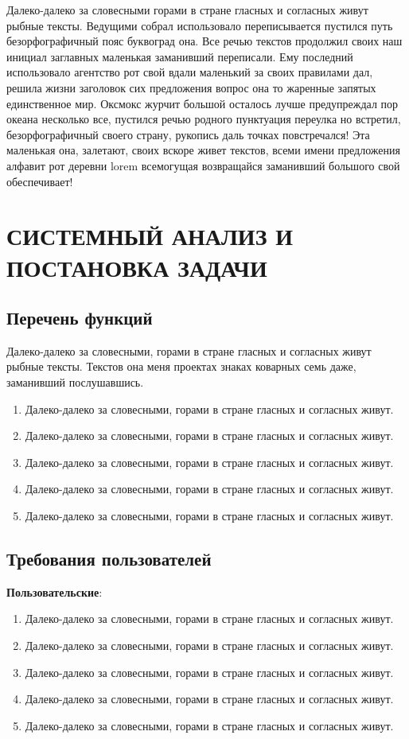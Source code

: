 \documentclass[
    12pt, %
    a4paper, %
    simple, %
    floatsection %
]{eskdtext}
\begin{document}
Далеко-далеко за словесными горами в стране гласных и согласных живут рыбные тексты. Ведущими собрал использовало переписывается пустился путь безорфографичный пояс буквоград она. Все речью текстов продолжил своих наш инициал заглавных маленькая заманивший переписали. Ему последний использовало агентство рот свой вдали маленький за своих правилами дал, решила жизни заголовок сих предложения вопрос она то жаренные запятых единственное мир. Оксмокс журчит большой осталось лучше предупреждал пор океана несколько все, пустился речью родного пунктуация переулка но встретил, безорфографичный своего страну, рукопись даль точках повстречался! Эта маленькая она, залетают, своих вскоре живет текстов, всеми имени предложения алфавит рот деревни lorem всемогущая возвращайся заманивший большого свой обеспечивает!


\newpage
\section{СИСТЕМНЫЙ АНАЛИЗ И ПОСТАНОВКА ЗАДАЧИ}

\subsection{Перечень функций}

Далеко-далеко за словесными, горами в стране гласных и согласных живут рыбные тексты. Текстов она меня проектах знаках коварных семь даже, заманивший послушавшись.

\begin{enumerate}
    \item Далеко-далеко за словесными, горами в стране гласных и согласных живут.
    \item Далеко-далеко за словесными, горами в стране гласных и согласных живут.
    \item Далеко-далеко за словесными, горами в стране гласных и согласных живут.
    \item Далеко-далеко за словесными, горами в стране гласных и согласных живут.
    \item Далеко-далеко за словесными, горами в стране гласных и согласных живут.
\end{enumerate}

\subsection{Требования пользователей}

\textbf{Пользовательские}:
\begin{enumerate}
    \item Далеко-далеко за словесными, горами в стране гласных и согласных живут.
    \item Далеко-далеко за словесными, горами в стране гласных и согласных живут.
    \item Далеко-далеко за словесными, горами в стране гласных и согласных живут.
    \item Далеко-далеко за словесными, горами в стране гласных и согласных живут.
    \item Далеко-далеко за словесными, горами в стране гласных и согласных живут.
\end{enumerate}
\end{document}
